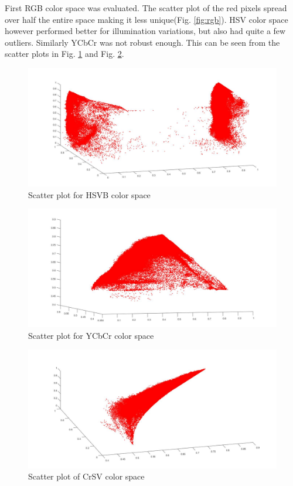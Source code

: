 \documentclass[fleqn,10pt]{SelfArx} %
\begin{document}
First RGB color space was evaluated. The scatter plot of the red pixels spread over half the entire space making it less unique(Fig. \ref{fig:rgb}). HSV color space however performed better for illumination variations, but also had quite a few outliers. Similarly YCbCr was not robust enough. This can be seen from the scatter plots in Fig. \ref{fig:hsv} and Fig. \ref{fig:ycbcr}.

\begin{figure}[hbtp]
\centering
\includegraphics[scale=0.15]{hsv.jpg}
\caption{Scatter plot for HSVB color space}
\label{fig:hsv}
\end{figure}

\begin{figure}[hbtp]
\centering
\includegraphics[scale=0.15]{ycbcr.jpg}
\caption{Scatter plot for YCbCr color space}
\label{fig:ycbcr}
\end{figure}

\begin{figure}[hbtp]
\centering
\includegraphics[scale=0.15]{custom.jpg}
\caption{Scatter plot of CrSV color space}
\label{fig:CrSV}
\end{figure}
\end{document}
